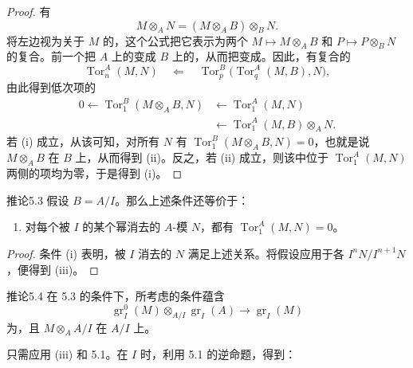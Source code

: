 \begin{proof}
有
\[
M\otimes_A N=(M\otimes_A B)\otimes_B N.
\]
将左边视为关于 $M$ 的，这个公式把它表示为两个 $M\mapsto M\otimes_A B$ 和 $P\mapsto P\otimes_B N$ 的复合。前一个把 $A$ 上的变成 $B$ 上的，从而把变成。因此，有复合的
\[
\operatorname{Tor}_n^A(M,N)
\quad\Longleftarrow\quad
\operatorname{Tor}_p^B\bigl(\operatorname{Tor}_q^A(M,B),N\bigr),
\]
由此得到低次项的
\[
\begin{aligned}
0\longleftarrow\operatorname{Tor}_1^B(M\otimes_A B,N)
&\longleftarrow\operatorname{Tor}_1^A(M,N)\\
&\longleftarrow\operatorname{Tor}_1^A(M,B)\otimes_A N.
\end{aligned}
\]
若 (i) 成立，从该可知，对所有 $N$ 有 $\operatorname{Tor}_1^B(M\otimes_A B,N)=0$，也就是说 $M\otimes_A B$ 在 $B$ 上，从而得到 (ii)。反之，若 (ii) 成立，则该中位于 $\operatorname{Tor}_1^A(M,N)$ 两侧的项均为零，于是得到 (i)。
\end{proof}

\begin{SGAresult}{推论}{5.3}
假设 $B=A/I$。那么上述条件还等价于：
\begin{enumerate}
\item[(iii)] 对每个被 $I$ 的某个幂消去的 $A$-模 $N$，都有 $\operatorname{Tor}_1^A(M,N)=0$。
\end{enumerate}
\end{SGAresult}
\begin{proof}
条件 (i) 表明，被 $I$ 消去的 $N$ 满足上述关系。将假设应用于各 $I^nN/I^{n+1}N$，便得到 (iii)。
\end{proof}

\begin{SGAresult}{推论}{5.4}
在 5.3 的条件下，所考虑的条件蕴含
\[
\operatorname{gr}_I^0(M)\otimes_{A/I}\operatorname{gr}_I(A)
\longrightarrow\operatorname{gr}_I(M)\tag{$*$}
\]
为，且 $M\otimes_A A/I$ 在 $A/I$ 上。
\end{SGAresult}
只需应用 (iii) 和 5.1。在 $I$ 时，利用 5.1 的逆命题，得到：

